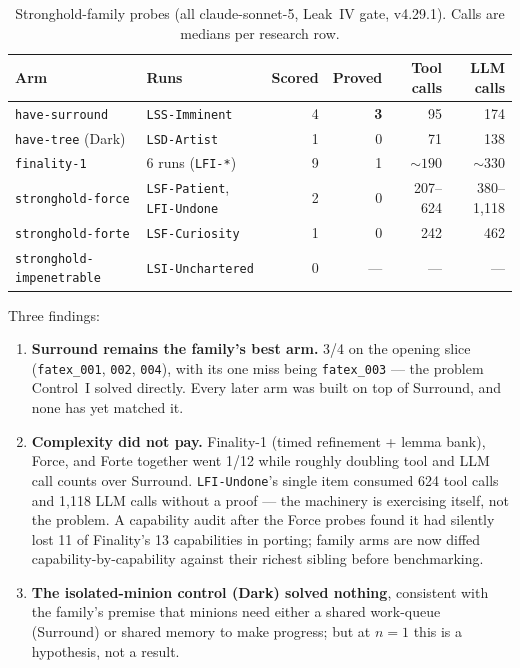 \documentclass[12pt, a4paper]{article}
\newcommand{\run}[1]{\texttt{#1}}
\begin{document}
\begin{table}[H]
\centering\footnotesize
\caption{Stronghold-family probes (all claude-sonnet-5, Leak~IV gate,
v4.29.1). Calls are medians per research row.}
\label{tab:stronghold}
\begin{tabular}{@{}llrrrr@{}}
\toprule
Arm & Runs & Scored & Proved & Tool calls & LLM calls \\
\midrule
\run{have-surround} & \run{LSS-Imminent} & 4 & \textbf{3} & 95 & 174 \\
\run{have-tree} (Dark) & \run{LSD-Artist} & 1 & 0 & 71 & 138 \\
\run{finality-1} & 6 runs (\run{LFI-*}) & 9 & 1 & ${\sim}190$ & ${\sim}330$ \\
\run{stronghold-force} & \run{LSF-Patient}, \run{LFI-Undone} & 2 & 0 & 207--624 & 380--1{,}118 \\
\run{stronghold-forte} & \run{LSF-Curiosity} & 1 & 0 & 242 & 462 \\
\run{stronghold-impenetrable} & \run{LSI-Unchartered} & 0 & --- & --- & --- \\
\bottomrule
\end{tabular}
\end{table}

Three findings:

\begin{enumerate}[itemsep=2pt]
\item \textbf{Surround remains the family's best arm.} 3/4 on the opening
      slice (\run{fatex\_001}, \run{002}, \run{004}), with its one miss being
      \run{fatex\_003} --- the problem Control~I solved directly. Every
      later arm was built on top of Surround, and none has yet matched it.
\item \textbf{Complexity did not pay.} Finality-1 (timed refinement + lemma
      bank), Force, and Forte together went 1/12 while roughly doubling tool
      and LLM call counts over Surround. \run{LFI-Undone}'s single item
      consumed 624 tool calls and 1{,}118 LLM calls without a proof --- the
      machinery is exercising itself, not the problem. A capability audit
      after the Force probes found it had silently lost 11 of Finality's 13
      capabilities in porting; family arms are now diffed
      capability-by-capability against their richest sibling before
      benchmarking.
\item \textbf{The isolated-minion control (Dark) solved nothing}, consistent
      with the family's premise that minions need either a shared work-queue
      (Surround) or shared memory to make progress; but at $n=1$ this is a
      hypothesis, not a result.
\end{enumerate}
\end{document}
